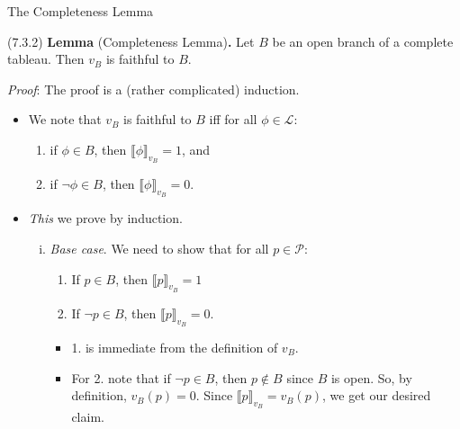 \documentclass[../slides.tex]{subfiles}
\begin{document}
\begin{frame}{The Completeness Lemma}

(7.3.2) \textbf{Lemma} (Completeness Lemma)\textbf{.} Let $B$ be an open branch of a complete tableau. Then $v_B$ is faithful to $B$.

\emph{Proof}: The proof is a (rather complicated) induction.

	\begin{itemize}
	
		\item We note that $v_B$ is faithful to $B$ iff for all $\phi\in\mathcal{L}$:
	\begin{enumerate}[1.]
	
		\item if $\phi\in B$, then $\llbracket\phi\rrbracket_{v_B}=1$, and 
		\item if $\neg \phi\in B$, then $\llbracket\phi\rrbracket_{v_B}=0$.
	
	\end{enumerate}
	
		\item \emph{This} we prove by induction.
		
		\begin{enumerate}[(i)]
	
		\item \emph{Base case}. We need to show that for all $p\in \mathcal{P}$:
		\begin{enumerate}[1.]
		 	\item If $p\in B$, then $\llbracket p\rrbracket_{v_B}=1$
			\item If $\neg p\in B$, then $\llbracket p\rrbracket_{v_B}=0$.
		\end{enumerate}
		
		\begin{itemize}
		
		\item 1. is immediate from the definition of $v_B$. 
		
		\item For 2. note that if $\neg p\in B$, then $p\notin B$ since $B$ is open. So, by definition, $v_B(p)=0$. Since $\llbracket p\rrbracket_{v_B}=v_B(p)$, we get our desired claim.
		
		\end{itemize}
		
		\end{enumerate}
	
	\end{itemize}

\end{frame}
\end{document}
